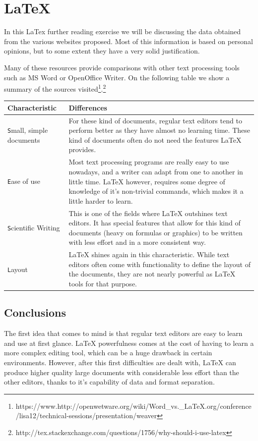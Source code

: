\chapter{LaTeX}

In this LaTex further reading exercise we will be discussing the data obtained from the various websites proposed. Most of this information is based on personal opinions, but to some extent they have a very solid justification.

Many of these resources provide comparisons with other text processing tools such as MS Word or OpenOffice Writer. On the following table we show a summary of the sources visited\footnote{https://www.http://openwetware.org/wiki/Word_vs._LaTeX.org/conference/lisa12/technical-sessions/presentation/weaver}.\footnote{http://tex.stackexchange.com/questions/1756/why-should-i-use-latex}

{
\centering
\begin{tabular}{l | p{8cm}}
Characteristic & Differences \\ \hline
\texttt Small, simple documents & For these kind of documents, regular text editors tend to perform better as they have almost no learning time. These kind of documents often do not need the features LaTeX provides. \\ \hline
\texttt Ease of use & Most text processing programs are really easy to use nowadays, and a writer can adapt from one to another in little time. LaTeX however, requires some degree of knowledge of it's non-trivial commands, which makes it a little harder to learn.  \\ \hline
\texttt Scientific Writing & This is one of the fields where LaTeX outshines text editors. It has special features that allow for this kind of documents (heavy on formulas or graphics) to be written with less effort and in a more consistent way.  \\ \hline
\texttt Layout & LaTeX shines again in this characteristic. While text editors often come with functionality to define the layout of the documents, they are not nearly powerful as LaTeX tools for that purpose.  \\ \hline
\end{tabular}
}



\section{Conclusions}
\label{sec:conclusions}

The first idea that comes to mind is that regular text editors are easy to learn and use at first glance. LaTeX powerfulness comes at the cost of having to learn a more complex editing tool, which can be a huge drawback in certain environments. However, after this first difficulties are dealt with, LaTeX can produce higher quality large documents with considerable less effort than the other editors, thanks to it's capability of data and format separation.


